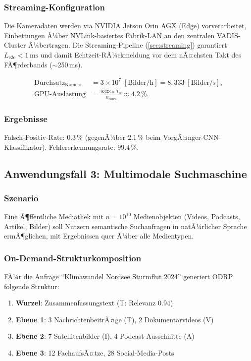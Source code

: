 ﻿\documentclass[12pt,a4paper]{article}
\begin{document}
\subsubsection{Streaming-Konfiguration}
Die Kameradaten werden via NVIDIA Jetson Orin AGX (Edge)
vorverarbeitet, Einbettungen Ã¼ber NVLink-basiertes Fabrik-LAN
an den zentralen VADIS-Cluster Ã¼bertragen. Die Streaming-Pipeline
(\cref{sec:streaming}) garantiert $L_{\text{e2e}} < 1\,\mathrm{ms}$
und damit Echtzeit-RÃ¼ckmeldung vor dem nÃ¤chsten Takt des
FÃ¶rderbands ($\sim$250\,ms).

\begin{align}
  \text{Durchsatz}_{\text{Kamera}} &= 3 \times 10^7 \;[\text{Bilder/h}]
    = 8{,}333 \;[\text{Bilder/s}], \\
  \text{GPU-Auslastung} &= \frac{8333 \times T_\Phi}{n_{\text{cores}}}
    \approx 4.2\,\%.
\end{align}

\subsubsection{Ergebnisse}
Falsch-Positiv-Rate: $0.3\,\%$ (gegenÃ¼ber $2.1\,\%$ beim
VorgÃ¤nger-CNN-Klassifikator). Fehler\-erkennungsrate: $99.4\,\%$.

\subsection{Anwendungsfall 3: Multimodale Suchmaschine}

\subsubsection{Szenario}
Eine Ã¶ffentliche Mediathek mit $n = 10^{10}$ Medienobjekten
(Videos, Podcasts, Artikel, Bilder) soll Nutzern semantische
Suchanfragen in natÃ¼rlicher Sprache ermÃ¶glichen, mit Ergebnissen
quer Ã¼ber alle Medientypen.

\subsubsection{On-Demand-Strukturkomposition}
FÃ¼r die Anfrage ``Klimawandel Nordsee Sturmflut 2024''
generiert ODRP folgende Struktur:

\begin{enumerate}[leftmargin=1.2em, itemsep=1pt]
  \item \textbf{Wurzel}: Zusammenfassungstext (T: Relevanz 0.94)
  \item \textbf{Ebene 1}: 3 NachrichtenbeitrÃ¤ge (T), 2 Dokumentarvideos (V)
  \item \textbf{Ebene 2}: 7 Satellitenbilder (I), 4 Podcast-Ausschnitte (A)
  \item \textbf{Ebene 3}: 12 FachaufsÃ¤tze, 28 Social-Media-Posts
\end{enumerate}
\end{document}
